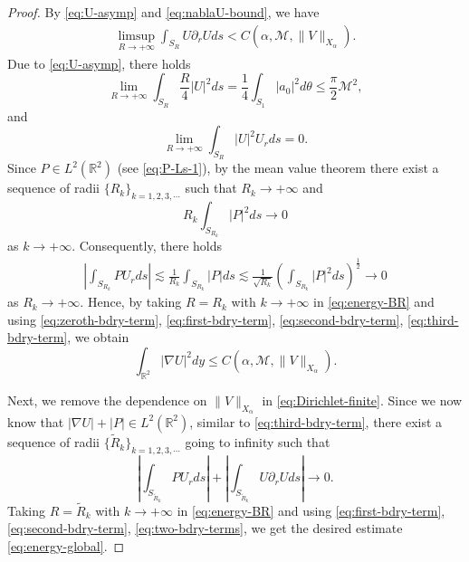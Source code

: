 \documentclass[12pt,reqno]{amsart}
\theoremstyle{plain}
\theoremstyle{definition}
\newcommand{\R}{\mathbb{R}}
\newcommand{\M}{\mathcal{M}}
\renewcommand{\:}{\colon}
\numberwithin{equation}{section}
\numberwithin{figure}{section}
\begin{document}
\begin{proof}
    By \eqref{eq:U-asymp} and \eqref{eq:nablaU-bound}, we have
    \begin{align} \label{eq:zeroth-bdry-term}
    	\limsup_{R \to +\infty} \int_{S_R} U \partial_r U ds < C(\alpha, \M, \|V\|_{X_\alpha}). 
    \end{align}
    Due to \eqref{eq:U-asymp}, there holds
    \begin{equation} \label{eq:first-bdry-term}
        \lim_{R \to +\infty} \int_{S_R} \frac{R}{4} |U|^2 ds = \frac{1}{4} \int_{S_1} |a_0|^2 d\theta \le \frac{\pi}{2} \M^2,
    \end{equation}
    and 
    \begin{equation} \label{eq:second-bdry-term}
        \lim_{R \to +\infty} \int_{S_R} |U|^2 U_r ds = 0.
    \end{equation}
   Since $P \in L^2(\R^2)$ (see \eqref{eq:P-Ls-1}), by the mean value theorem there exist a sequence of radii $\{R_k\}_{k=1,2,3,\cdots}$ such that $R_k \to +\infty$ and
    \begin{equation}
         R_k{\int_{S_{R_k}} |P|^2 ds} \to 0
    \end{equation}
    as $k \to +\infty$. Consequently, there holds
    \begin{align} \label{eq:third-bdry-term}
        \left|\int_{S_{R_k}} P U_r ds\right| \lesssim \frac{1}{R_k} \int_{S_{R_k}} |P| ds 
        \lesssim \frac{1}{\sqrt{R_k}} \left(\int_{S_{R_k}} |P|^2 ds \right)^\frac12 \to 0
    \end{align}
    as $R_k \to +\infty$. Hence, by taking $R = R_k$ with $k \to +\infty$ in \eqref{eq:energy-BR} and using \eqref{eq:zeroth-bdry-term}, \eqref{eq:first-bdry-term}, \eqref{eq:second-bdry-term}, \eqref{eq:third-bdry-term}, we obtain 
    \begin{equation} \label{eq:Dirichlet-finite}
    	\int_{\R^2} |\nabla U|^2 dy \le C(\alpha, \M, \|V\|_{X_\alpha}).
    \end{equation}
    
    Next, we remove the dependence on $\|V\|_{X_\alpha}$ in \eqref{eq:Dirichlet-finite}. Since we now know that $|\nabla U| + |P| \in L^2(\R^2)$, similar to  \eqref{eq:third-bdry-term}, there exist  a sequence of radii $\{\widetilde{R}_k\}_{k=1,2,3,\cdots}$ going to infinity such that
    \begin{equation} \label{eq:two-bdry-terms}
    	 \left|\int_{S_{\widetilde{R}_k}} P U_r ds\right| + \left|\int_{S_{\widetilde{R}_k}} U \partial_r U ds\right| \to 0.
    \end{equation}
    Taking $R = \widetilde{R}_k$ with $k \to +\infty$ in \eqref{eq:energy-BR} and using \eqref{eq:first-bdry-term}, \eqref{eq:second-bdry-term}, \eqref{eq:two-bdry-terms}, we get the desired estimate \eqref{eq:energy-global}.
    
\end{proof}
\end{document}
